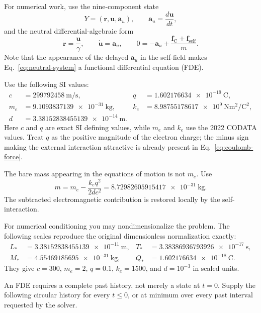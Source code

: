 For numerical work, use the nine-component state
\begin{equation}
  Y=(\bm r,\bm u,\bm a_u),
  \qquad \bm a_u=\frac{d\bm u}{dt},
\end{equation}
and the neutral differential-algebraic form
\begin{equation}
  \dot{\bm r}=\frac{\bm u}{\gamma},
  \qquad
  \dot{\bm u}=\bm a_u,
  \qquad
  0=-\bm a_u+\frac{\bm f_{\mathrm C}+\bm f_{\mathrm{self}}}{m}.
  \label{eq:neutral-system}
\end{equation}
Note that the appearance of the delayed $\bm a_u$ in the self-field makes
Eq.~\eqref{eq:neutral-system} a functional differential equation (FDE).

Use the following SI values:
\begin{align}
  c &= \SI{299792458}{\metre\per\second},
  &q &= \SI{1.602176634e-19}{\coulomb},\\
  m_e &= \SI{9.1093837139e-31}{\kilogram},
  &k_e &= \SI{8.98755178617e9}{\newton\metre\squared\per\coulomb\squared},\\
  d &= \SI{3.38152838455139e-14}{\metre}.
\end{align}
Here $c$ and $q$ are exact SI defining values, while $m_e$ and $k_e$ use the
2022 CODATA values.  Treat $q$ as the positive magnitude of the electron
charge; the minus sign making the external interaction attractive is already
present in Eq.~\eqref{eq:coulomb-force}.

The bare mass appearing in the equations of motion is not $m_e$.  Use
\begin{equation}
  m=m_e-\frac{k_eq^2}{2dc^2}
   =\SI{8.72982605915417e-31}{\kilogram}.
  \label{eq:bare-mass}
\end{equation}
The subtracted electromagnetic contribution is restored locally by the
self-interaction.

For numerical conditioning you may nondimensionalize the problem.  The
following scales reproduce the original dimensionless normalization exactly:
\begin{align}
  L_* &= \SI{3.38152838455139e-11}{\metre},
  &T_* &= \SI{3.38386936793926e-17}{\second},\\
  M_* &= \SI{4.55469185695e-31}{\kilogram},
  &Q_* &= \SI{1.602176634e-18}{\coulomb}.
\end{align}
They give $c=300$, $m_e=2$, $q=0.1$, $k_e=1500$, and $d=10^{-3}$ in scaled
units.  

An FDE requires a complete past history, not merely a state at $t=0$.  Supply
the following circular history for every $t\leq0$, or at minimum over every
past interval requested by the solver.

